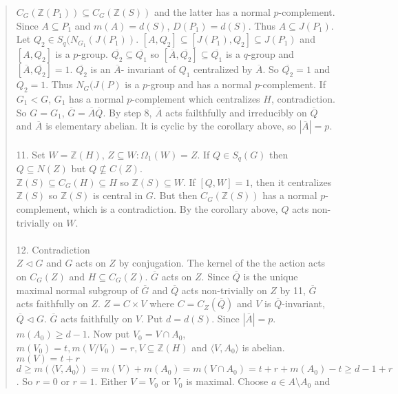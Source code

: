 \begin{quote}
$C_G({\mathbb Z}(P_1)) \subseteq C_G({\mathbb Z}(S))$ and the latter has a normal $p$-complement.
Since $A \subseteq P_1$ and $m(A) = d(S)$, $D(P_1)=d(S)$.
Thus $A \subseteq J(P_1)$.  Let $Q_2 \in S_q(N_{G_1}(J(P_1))$.
$[A, Q_2] \subseteq [J(P_1), Q_2] \subseteq J(P_1)$ and $[A, Q_2]$ is a $p$-group.
${\overline {Q_2}} \subseteq {\overline {Q_1}}$ so
$[{\overline A}, {\overline {Q_2}}] \subseteq {\overline {Q_1}}$
is a $q$-group and $[{\overline A}, {\overline {Q_2}}] =1$.
${\overline {Q_2}}$ is an ${\overline A}$- invariant
of $Q_1$ centralized by ${\overline A}$.
So ${\overline {Q_2}} = 1$  and $Q_2 = 1$.  Thus $N_G(J(P)$ is
a $p$-group and has a normal $p$-complement.  If $G_1 < G$, $G_1$ has a normal $p$-complement which centralizes
$H$, contradiction.  So $G = G_1$, ${\overline G} = {\overline A} {\overline Q}$.  By step 8,
${\overline A}$ acts failthfully and irreducibly on ${\overline Q}$ and ${\overline A}$ is elementary abelian.
It is cyclic by the corollary above, so $|{\overline A}|=p$.
\\
\\
11.  Set $W = {\mathbb Z}(H)$, $Z \subseteq W: \Omega_1(W) = Z$.  If $Q \in S_q(G)$ then $Q \subseteq N(Z)$ but
$Q \nsubseteq C(Z)$.
\\
${\mathbb Z}(S) \subseteq C_G(H) \subseteq H$ so ${\mathbb Z}(S) \subseteq W$.
If $[Q, W] =1$, then it centralizes ${\mathbb Z}(S)$ so ${\mathbb Z}(S)$
is central in $G$.
But then $C_G({\mathbb Z}(S))$ has a normal $p$-complement, which is a contradiction.
By the corollary above, $Q$ acts non-trivially on $W$.
\\
\\
12.  Contradiction
\\
$Z \lhd G$ and $G$ acts on $Z$ by conjugation.  The kernel of the the action acts on
$C_G(Z)$ and $H \subseteq C_G(Z)$.
${\overline G}$ acts on $Z$.  Since ${\overline Q}$ is the unique maximal normal subgroup of ${\overline G}$
and ${\overline Q}$ acts non-trivially on $Z$ by 11, ${\overline G}$ acts faithfully on $Z$.
$Z = C \times V$ where $C= C_Z({\overline Q})$ and $V$ is ${\overline Q}$-invariant, ${\overline Q} \lhd G$.
${\overline G}$ acts faithfully on $V$.  Put $d=d(S)$.  Since $|{\overline A}| = p$.  $m(A_0) \geq d - 1$.
Now put
$V_0 = V \cap A_0$, $m(V_0) = t, m(V/V_0) = r, V \subseteq {\mathbb Z}(H)$ and $\langle V, A_0 \rangle$ is abelian.
$m(V) = t+r$  $d \geq m( \langle V, A_0 \rangle )= m(V) + m(A_0) = m( V \cap A_0 )= t+r+m(A_0 ) -t \geq d-1+r$.
So $r=0$ or $r = 1$.  Either $V = V_0$ or $V_0$ is maximal.  Choose $a \in A \setminus A_0$ and

\end{quote}
